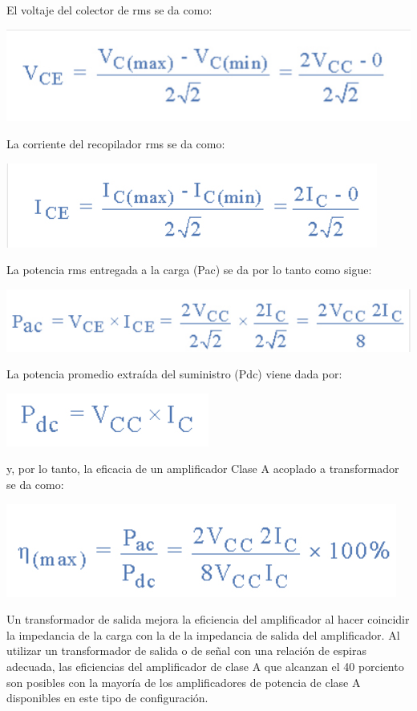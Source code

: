 \documentclass[10pt,a4paper]{article}
\begin{document}
El voltaje del colector de rms se da como:\\
\begin{center}
\includegraphics[scale=0.3]{img5.png} 
\end{center}
La corriente del recopilador rms se da como:\\
\begin{center}
\includegraphics[scale=0.3]{img6.png} 
\end{center}
La potencia rms entregada a la carga (Pac) se da por lo tanto como sigue:\\
\begin{center}
\includegraphics[scale=0.4]{img7.png} 
\end{center}
La potencia promedio extraída del suministro (Pdc) viene dada por:\\
\begin{center}
\includegraphics[scale=0.4]{img8.png} 
\end{center}
y, por lo tanto, la eficacia de un amplificador Clase A acoplado a transformador se da como:\\
\begin{center}
 \includegraphics[scale=0.4]{img9.png} 
 \end{center} Un transformador de salida mejora la eficiencia del amplificador al hacer coincidir la impedancia de la carga con la de la impedancia de salida del amplificador. Al utilizar un transformador de salida o de señal con una relación de espiras adecuada, las eficiencias del amplificador de clase A que alcanzan el 40 porciento son posibles con la mayoría de los amplificadores de potencia de clase A disponibles en este tipo de configuración.\\
\end{document}
